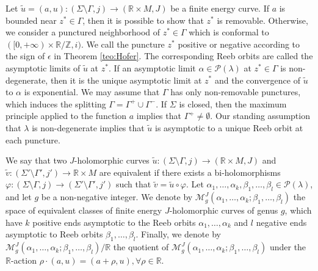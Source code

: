 \documentclass{amsart}
\newcommand{\R}{\mathbb{R}}
\newcommand{\Z}{\mathbb{Z}}
\newcommand{\M}{\mathcal{M}}
\renewcommand{\P}{\mathcal{P}}
\begin{document}
Let $\tilde u=(a,u):(\Sigma \setminus \Gamma,j) \to (\R \times M, J)$ be a finite energy curve. If $a$ is bounded near $z^* \in \Gamma$, then it is possible to show that $z^*$ is removable. Otherwise, we consider a punctured neighborhood of $z^* \in \Gamma$ which is conformal to $([0,+\infty) \times \R / \Z,i)$. We call the puncture $z^*$  positive or  negative according to the sign of $\epsilon$ in Theorem \ref{teo:Hofer}. The corresponding Reeb orbits are called the asymptotic limits of $\tilde u$ at $z^*$. If an asymptotic limit $\alpha \in \P(\lambda)$ at $z^*\in \Gamma$ is non-degenerate, then it is the unique asymptotic limit at $z^*$ and the convergence of $\tilde u$ to $\alpha$ is exponential.  We may assume that $\Gamma$ has only non-removable punctures, which induces the splitting $\Gamma = \Gamma^+ \cup \Gamma^-.$ If $\Sigma$ is closed, then the maximum principle applied to the function $a$ implies that $\Gamma^+ \neq \emptyset.$ Our standing assumption that $\lambda$ is non-degenerate implies that $\tilde u$ is asymptotic to a unique Reeb orbit at each puncture.






We say that two $J$-holomorphic curves $\tilde u:(\Sigma \setminus \Gamma,j) \to (\R \times M, J)$ and $\tilde v:(\Sigma'\setminus \Gamma',j') \to \R \times M$ are equivalent if there exists a bi-holomorphisms $\varphi:(\Sigma\setminus \Gamma,j) \to (\Sigma'\setminus \Gamma',j')$ such that $\tilde v = \tilde u \circ \varphi$. Let $\alpha_1, \ldots, \alpha_k, \beta_1, \ldots, \beta_l\in \P(\lambda)$, and let $g$ be a non-negative integer. We denote by
$\M^J_g(\alpha_1,\ldots,\alpha_k;\beta_1,\ldots,\beta_l)$
the space of equivalent classes of finite energy $J$-holomorphic curves of genus $g$, which have $k$ positive ends asymptotic to the Reeb orbits $\alpha_1,\ldots,\alpha_k$ and $l$ negative ends asymptotic to Reeb orbits $\beta_1 ,\ldots,\beta_l$.
Finally, we denote by
$\M^J_g(\alpha_1,\ldots,\alpha_k;\beta_1,\ldots,\beta_l)/\R$
the quotient of $\M^J_g(\alpha_1,\ldots,\alpha_k;\beta_1,\ldots,\beta_l)$ under the $\R$-action $\rho \cdot (a,u) = (a+\rho,u), \forall \rho\in\R$. 
\end{document}
